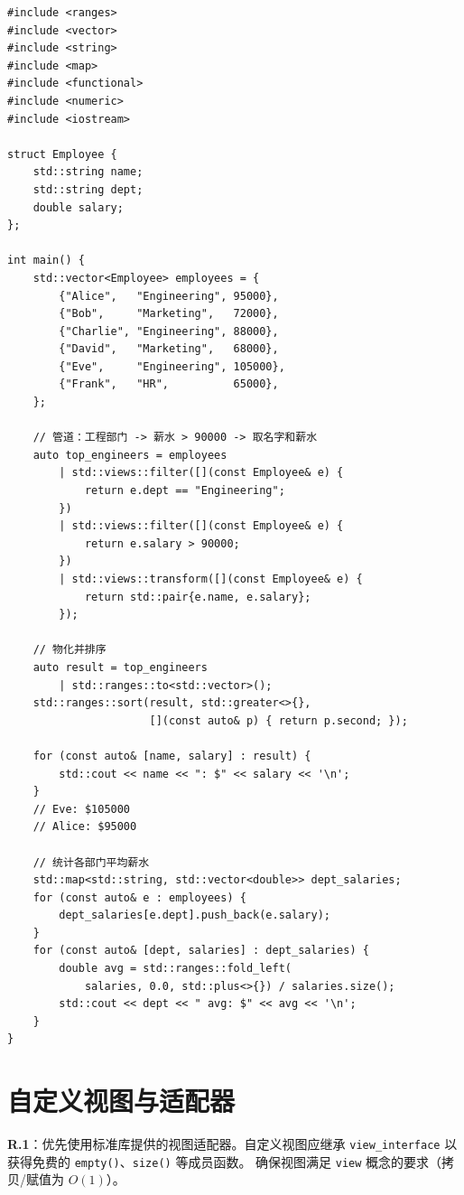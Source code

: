\documentclass[12pt,a4paper,fontset=fandol]{ctexbook}
\newcommand{\Tp}[1]{\texttt{#1}}
\begin{document}
\begin{lstlisting}
#include <ranges>
#include <vector>
#include <string>
#include <map>
#include <functional>
#include <numeric>
#include <iostream>

struct Employee {
    std::string name;
    std::string dept;
    double salary;
};

int main() {
    std::vector<Employee> employees = {
        {"Alice",   "Engineering", 95000},
        {"Bob",     "Marketing",   72000},
        {"Charlie", "Engineering", 88000},
        {"David",   "Marketing",   68000},
        {"Eve",     "Engineering", 105000},
        {"Frank",   "HR",          65000},
    };

    // 管道：工程部门 -> 薪水 > 90000 -> 取名字和薪水
    auto top_engineers = employees
        | std::views::filter([](const Employee& e) {
            return e.dept == "Engineering";
        })
        | std::views::filter([](const Employee& e) {
            return e.salary > 90000;
        })
        | std::views::transform([](const Employee& e) {
            return std::pair{e.name, e.salary};
        });

    // 物化并排序
    auto result = top_engineers
        | std::ranges::to<std::vector>();
    std::ranges::sort(result, std::greater<>{},
                      [](const auto& p) { return p.second; });

    for (const auto& [name, salary] : result) {
        std::cout << name << ": $" << salary << '\n';
    }
    // Eve: $105000
    // Alice: $95000

    // 统计各部门平均薪水
    std::map<std::string, std::vector<double>> dept_salaries;
    for (const auto& e : employees) {
        dept_salaries[e.dept].push_back(e.salary);
    }
    for (const auto& [dept, salaries] : dept_salaries) {
        double avg = std::ranges::fold_left(
            salaries, 0.0, std::plus<>{}) / salaries.size();
        std::cout << dept << " avg: $" << avg << '\n';
    }
}
\end{lstlisting}

\chapter{自定义视图与适配器}

\begin{guideline}
\textbf{R.1}：优先使用标准库提供的视图适配器。自定义视图应继承
\texttt{view\_interface} 以获得免费的 \Tp{empty()}、\Tp{size()} 等成员函数。
确保视图满足 \texttt{view} 概念的要求（拷贝/赋值为 $O(1)$）。
\end{guideline}
\end{document}
